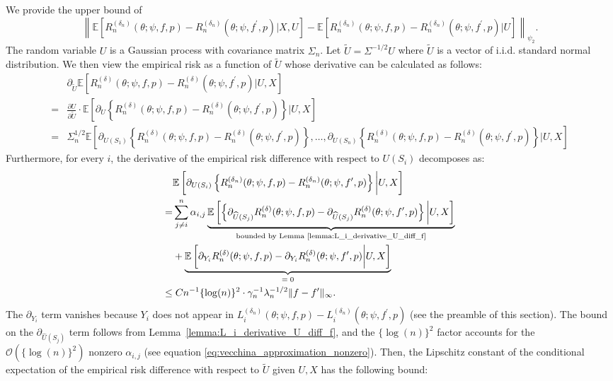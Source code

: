 \documentclass[12pt]{article}
\newcommand{\E}{\mathbb{E}}
\begin{document}
\noindent We provide the upper bound of
$$\left\|\E\left[R_n^{(\delta_n)}(\theta;\psi,f,p)-R_n^{({\delta_n})}(\theta;\psi,f^\prime,p)|X,U\right]-\E\left[R_n^{(\delta_n)}(\theta;\psi,f,p)-R_n^{({\delta_n})}(\theta;\psi,f^\prime,p)|U\right]\right\|_{\psi_2}.$$
The random variable $U$ is a Gaussian process with covariance matrix $\Sigma_n$. Let $\widetilde U=\Sigma^{-1/2} U$ where $\widetilde U$ is a vector of i.i.d. standard normal distribution. We then view the empirical risk as a function of $\widetilde U$ whose derivative can be calculated as follows:
\begin{align*}
    &\partial_{ \widetilde U}\E\left[R_n^{(\delta)}(\theta;\psi,f,p)-R_n^{(\delta)}(\theta;\psi,f^\prime,p)\bigg| U,X\right]\\
    = & \frac{\partial U}{ \partial \widetilde  U}\cdot  \E\left[\partial_{ U }\left\{R_n^{(\delta)}(\theta;\psi,f,p)-R_n^{(\delta)}(\theta;\psi,f^\prime,p)\right\}\bigg| U,X\right]\\
    = & \Sigma_n^{1/2}\E\left[\partial_{U(S_1)}\left\{R_n^{(\delta)}(\theta;\psi,f,p)-R_n^{(\delta)}(\theta;\psi,f^\prime,p)\right\},\ldots,\partial_{U(S_n)}\left\{R_n^{(\delta)}(\theta;\psi,f,p)-R_n^{(\delta)}(\theta;\psi,f^\prime,p)\right\}\bigg| U,X\right]
\end{align*}
Furthermore, for every $i$, the derivative of the empirical risk difference with respect to $U(S_i)$ decomposes as:
\begin{align*}
    &\E\left[\partial_{U(S_i)}\left\{R_n^{(\delta_n)}(\theta;\psi,f,p)-R_n^{({\delta_n})}(\theta;\psi,f^\prime,p)\right\}\bigg| U,X\right]\\
    = & \sum_{j\neq i}^n  \alpha_{i,j}\underbrace{\E\left[\left\{\partial_{\widehat U(S_j)}R_n^{(\delta)}(\theta;\psi,f,p)-\partial_{\widehat U(S_j)}R_n^{(\delta)}(\theta;\psi,f^\prime,p)\right\}\bigg| U,X\right]}_{\text{bounded by Lemma \ref{lemma:L_i_derivative_U_diff_f}}}\\
    &+ \underbrace{\E\left[\partial_{Y_i}R_n^{(\delta)}(\theta;\psi,f,p)   - \partial_{Y_i}R_n^{(\delta)}(\theta;\psi,f^\prime,p)\bigg| U,X\right]}_{=\;0}\\
    \leq &\;Cn^{-1}\{\log(n)\}^2\cdot\gamma_n^{-1}\lambda_n^{-1/2}\|f-f^\prime\|_\infty.
\end{align*}
The $\partial_{Y_i}$ term vanishes because $Y_i$ does not appear in $L^{(\delta_n)}_i(\theta;\psi,f,p)-L^{(\delta_n)}_i(\theta;\psi,f^\prime,p)$ (see the preamble of this section). The bound on the $\partial_{\widehat U(S_j)}$ term follows from Lemma~\ref{lemma:L_i_derivative_U_diff_f}, and the $\{\log(n)\}^2$ factor accounts for the $\mathcal{O}(\{\log(n)\}^2)$ nonzero $\alpha_{i,j}$ (see equation \eqref{eq:vecchina_approximation_nonzero}). Then, the Lipschitz constant of the conditional expectation of the empirical risk difference with respect to $\widetilde U$ given $U,X$ has the following bound:
\end{document}
